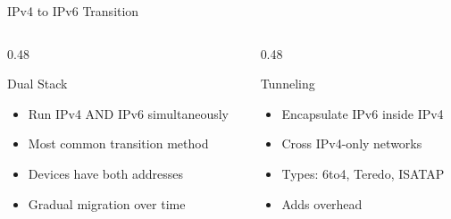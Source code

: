 \documentclass[aspectratio=169]{beamer}  %
\begin{document}
\begin{frame}[t,shrink=20]{IPv4 to IPv6 Transition}
    \begin{columns}[T]
        \begin{column}{0.48\textwidth}
            \begin{block}{Dual Stack}
                \begin{itemize}
                    \small
                    \item Run IPv4 AND IPv6 simultaneously
                    \item Most common transition method
                    \item Devices have both addresses
                    \item Gradual migration over time
                \end{itemize}
                
                \centering
            \end{block}
        \end{column}
        \begin{column}{0.48\textwidth}
            \begin{block}{Tunneling}
                \begin{itemize}
                    \scriptsize
                    \item Encapsulate IPv6 inside IPv4
                    \item Cross IPv4-only networks
                    \item Types: 6to4, Teredo, ISATAP
                    \item Adds overhead
                \end{itemize}
            \end{block}
            

\end{column}
\end{columns}
\end{frame}
\end{document}
